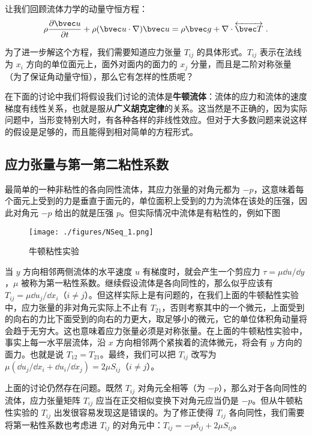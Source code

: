 
让我们回顾流体力学的动量守恒方程：
\begin{equation}
\rho \frac{\partial \bvec u}{\partial t}+\rho(\bvec u\cdot \nabla)\bvec u=\rho \bvec g+\nabla\cdot \overleftrightarrow {\bvec T}~.
\end{equation}

为了进一步解这个方程，我们需要知道应力张量 $T_{ij}$ 的具体形式。$T_{ij}$ 表示在法线为 $x_i$ 方向的单位面元上，面外对面内的面力的 $x_j$ 分量，而且是二阶对称张量（为了保证角动量守恒），那么它有怎样的性质呢？

在下面的讨论中我们将假设我们讨论的流体是\textbf{牛顿流体}：流体的应力和流体的速度梯度有线性关系，也就是服从\textbf{广义胡克定律}的关系。这当然是不正确的，因为实际问题中，当形变特别大时，有各种各样的非线性效应。但对于大多数问题来说这样的假设是足够的，而且能得到相对简单的方程形式。

\subsection{应力张量与第一第二粘性系数}
最简单的一种非粘性的各向同性流体，其应力张量的对角元都为 $-p$，这意味着每个面元上受到的力是垂直于面元的，单位面积上受到的力为流体在该处的压强，因此对角元 $-p$ 给出的就是压强 $p$。但实际情况中流体是有粘性的，例如下图
\begin{figure}[ht]
\centering
\texttt{[image: ./figures/NSeq\_1.png]}
\caption{牛顿粘性实验} \label{NSeq_fig1}
\end{figure}
当 $y$ 方向相邻两侧流体的水平速度 $u$ 有梯度时，就会产生一个剪应力 $\tau=\mu \dd u/\dd y$，$\mu$ 被称为第一粘性系数。继续假设流体是各向同性的，那么似乎应该有 $T_{ij}=\mu \dd u_j/\dd x_i$（$i\neq j$）。但这样实际上是有问题的，在我们上面的牛顿黏性实验中，应力张量的非对角元实际上不止有 $T_{21}$，否则考察其中的一个微元，上面受到的向右的力比下面受到的向右的力更大，取足够小的微元，它的单位体积角动量将会趋于无穷大。这也意味着应力张量必须是对称张量。在上面的牛顿粘性实验中，事实上每一水平层流体，沿 $x$ 方向相邻两个紧挨着的流体微元，将会有 $y$ 方向的面力。也就是说 $T_{12}=T_{21}$。最终，我们可以把 $T_{ij}$ 改写为 $\mu (\dd u_j/\dd x_i+\dd u_i/\dd x_j)=2\mu S_{ij}$（$i\neq j$）。

上面的讨论仍然存在问题。既然 $T_{ij}$ 对角元全相等（为 $-p$），那么对于各向同性的流体，应力张量矩阵 $T_{ij}$ 应当在正交相似变换下对角元应当仍是 $-p$。但从牛顿粘性实验的 $T_{ij}$ 出发很容易发现这是错误的。为了修正使得 $T_{ij}$ 各向同性，我们需要将第一粘性系数也考虑进 $T_{ij}$ 的对角元中：$T_{ij} = -p\delta_{ij}+2\mu S_{ij}$。

